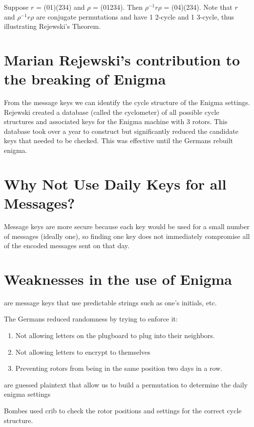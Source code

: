 \begin{example} Suppose $r$ = (01)(234) and $\rho$ = (01234). Then $\rho^{-1} r \rho$ = (04)(234). Note that $r$ and $\rho^{-1} r \rho$ are conjugate permutations and have 1 2-cycle and 1 3-cycle, thus illustrating Rejewski's Theorem.


\section{Marian Rejewski's contribution to the breaking of Enigma}

From the message keys we can identify the cycle structure of the Enigma settings. Rejewski created a database (called the cyclometer) of all possible cycle structures and associated keys for the Enigma machine with 3 rotors. This database took over a year to construct but significantly reduced the candidate keys that needed to be checked. This was effective until the Germans rebuilt enigma.

\section{Why Not Use Daily Keys for all Messages?}
Message keys are more secure because each key would be used for a small number of messages (ideally one), so finding one key does not immediately compromise all of the encoded messages sent on that day.

\section{Weaknesses in the use of Enigma}
\begin{definition}
 are message keys that use predictable strings such as one's initials, etc.
\end{definition}

The Germans reduced randomness by trying to enforce it:
\begin{enumerate}
\item Not allowing letters on the plugboard to plug into their neighbors.
\item Not allowing letters to encrypt to themselves
\item Preventing rotors from being in the same position two days in a row.
\end{enumerate}

\begin{definition}
 are guessed plaintext that allow us to build a permutation to determine the daily enigma settings  
\end{definition}
Bombes used crib to check the rotor positions and settings for the correct cycle structure.



\end{example}
